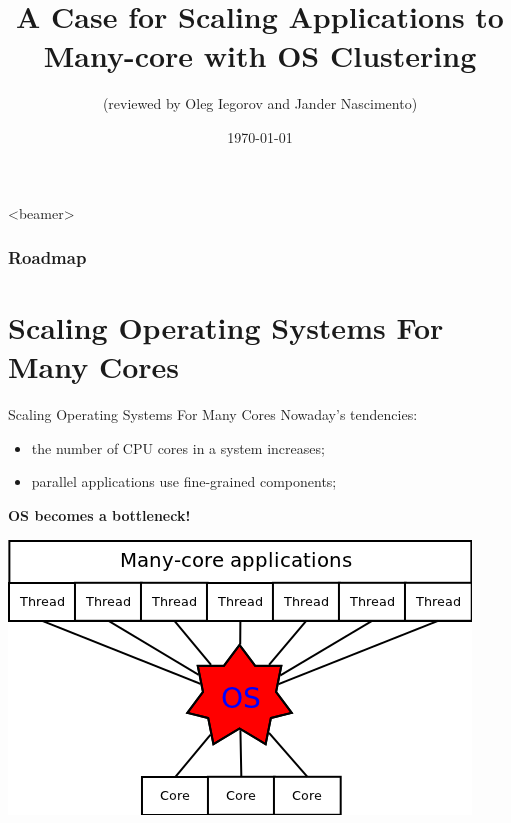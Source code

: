 \documentclass{beamer}
\title[A Case for Scaling Applications to Many-core with OS Clustering ]{A Case for Scaling Applications to Many-core with OS Clustering}
\author{
(reviewed by Oleg Iegorov and Jander Nascimento)}
\institute{University Joseph Fourier}
\date{\today}
\begin{document}
\begin{frame}
\titlepage
\end{frame}

{
  \begin{frame}<beamer>
    \frametitle{Roadmap}
    \tableofcontents%
  \end{frame}
}


\section{Scaling Operating Systems For Many Cores}

\begin{frame}{Scaling Operating Systems For Many Cores}
  Nowaday's tendencies:
  \begin{itemize}
    \item the number of CPU cores in a system increases;
    \item parallel applications use fine-grained components;
  \newline
  \end{itemize}

  \pause
  \textbf{OS becomes a bottleneck!}
  \newline
  
  \begin{center}
    \includegraphics[scale=0.4]{bottleneck.png}
  \end{center}
\end{frame}
\end{document}
